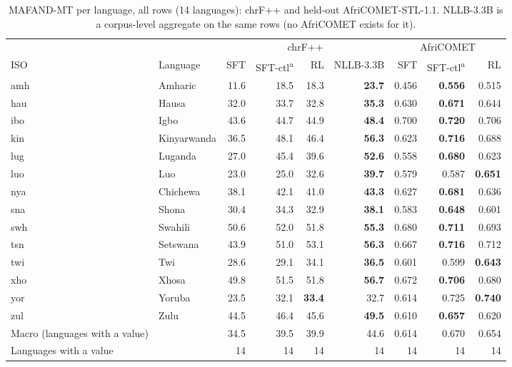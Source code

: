 \begin{table}[t]
\centering\footnotesize
\setlength{\tabcolsep}{3pt}
\begin{tabular}{@{}llrrrrrrr@{}}
\toprule
& & \multicolumn{4}{c}{chrF++} & \multicolumn{3}{c}{AfriCOMET} \\
\cmidrule(lr){3-6}\cmidrule(lr){7-9}
ISO & Language & SFT & SFT-ctl\textsuperscript{a} & RL & NLLB-3.3B & SFT & SFT-ctl\textsuperscript{a} & RL \\
\midrule
amh & Amharic & 11.6 & 18.5 & 18.3 & \textbf{23.7} & 0.456 & \textbf{0.556} & 0.515 \\
hau & Hausa & 32.0 & 33.7 & 32.8 & \textbf{35.3} & 0.630 & \textbf{0.671} & 0.644 \\
ibo & Igbo & 43.6 & 44.7 & 44.9 & \textbf{48.4} & 0.700 & \textbf{0.720} & 0.706 \\
kin & Kinyarwanda & 36.5 & 48.1 & 46.4 & \textbf{56.3} & 0.623 & \textbf{0.716} & 0.688 \\
lug & Luganda & 27.0 & 45.4 & 39.6 & \textbf{52.6} & 0.558 & \textbf{0.680} & 0.623 \\
luo & Luo & 23.0 & 25.0 & 32.6 & \textbf{39.7} & 0.579 & 0.587 & \textbf{0.651} \\
nya & Chichewa & 38.1 & 42.1 & 41.0 & \textbf{43.3} & 0.627 & \textbf{0.681} & 0.636 \\
sna & Shona & 30.4 & 34.3 & 32.9 & \textbf{38.1} & 0.583 & \textbf{0.648} & 0.601 \\
swh & Swahili & 50.6 & 52.0 & 51.8 & \textbf{55.3} & 0.680 & \textbf{0.711} & 0.693 \\
tsn & Setswana & 43.9 & 51.0 & 53.1 & \textbf{56.3} & 0.667 & \textbf{0.716} & 0.712 \\
twi & Twi & 28.6 & 29.1 & 34.1 & \textbf{36.5} & 0.601 & 0.599 & \textbf{0.643} \\
xho & Xhosa & 49.8 & 51.5 & 51.8 & \textbf{56.7} & 0.672 & \textbf{0.706} & 0.680 \\
yor & Yoruba & 23.5 & 32.1 & \textbf{33.4} & 32.7 & 0.614 & 0.725 & \textbf{0.740} \\
zul & Zulu & 44.5 & 46.4 & 45.6 & \textbf{49.5} & 0.610 & \textbf{0.657} & 0.620 \\
\midrule
Macro (languages with a value) &  & 34.5 & 39.5 & 39.9 & 44.6 & 0.614 & 0.670 & 0.654 \\
Languages with a value &  & 14 & 14 & 14 & 14 & 14 & 14 & 14 \\
\bottomrule
\end{tabular}
\caption{MAFAND-MT per language, all rows (14 languages): chrF++ and held-out AfriCOMET-STL-1.1. NLLB-3.3B is a corpus-level aggregate on the same rows (no AfriCOMET exists for it).}
\label{tab:fr-mf-merged}
\end{table}

